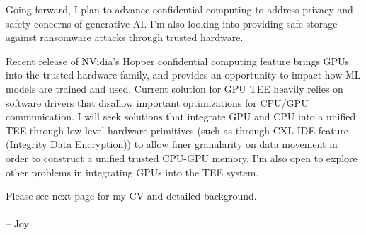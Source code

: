 \vspace{3ex}
Going forward, I plan to advance confidential computing to address privacy and safety concerns of generative AI. I'm also looking into providing safe storage against ransomware attacks through trusted hardware. \par
Recent release of NVidia's Hopper confidential computing feature brings GPUs into the trusted hardware family, and provides an opportunity to impact how ML models are trained and used. Current solution for GPU TEE heavily relies on software drivers that disallow important optimizations for CPU/GPU communication. I will seek solutions that integrate GPU and CPU into a unified TEE through low-level hardware primitives (such as through CXL-IDE feature (Integrity Data Encryption)) to allow finer granularity on data movement in order to construct a unified trusted CPU-GPU memory. I'm also open to explore other problems in integrating GPUs into the TEE system. \\

\vspace{3ex}

Please see next page for my CV and detailed background. \\
\paragraph*{}
\begin{flushright} -- Joy\end{flushright}
